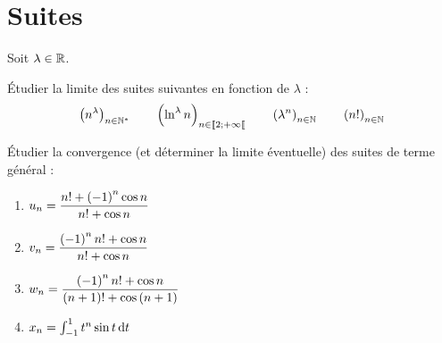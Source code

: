 \chapter{Suites}

\begin{exo}
Soit \(\lambda\in\mathbb{R}\).

Étudier la limite des suites suivantes en fonction de \(\lambda\) : \[\left(n^\lambda\right)_{n\in\mathbb{N}^*}\qquad\left(\ln^\lambda n\right)_{n\in\left\llbracket2;+\infty\right\llbracket}\qquad\left(\lambda^n\right)_{n\in\mathbb{N}}\qquad\left(n!\right)_{n\in\mathbb{N}}\]
\end{exo}

\begin{corr}
\end{corr}

\begin{exo}[Exercice 2]
Étudier la convergence (et déterminer la limite éventuelle) des suites de terme général :

\begin{enumerate}
\item \(u_n=\dfrac{n!+\left(-1\right)^n\cos n}{n!+\cos n}\) \\

\item \(v_n=\dfrac{\left(-1\right)^nn!+\cos n}{n!+\cos n}\) \\

\item \(w_n=\dfrac{\left(-1\right)^nn!+\cos n}{\left(n+1\right)!+\cos\left(n+1\right)}\) \\

\item \(x_n=\int_{-1}^1t^n\sin t\odif{t}\)
\end{enumerate}
\end{exo}

\begin{corr}
\end{corr}

